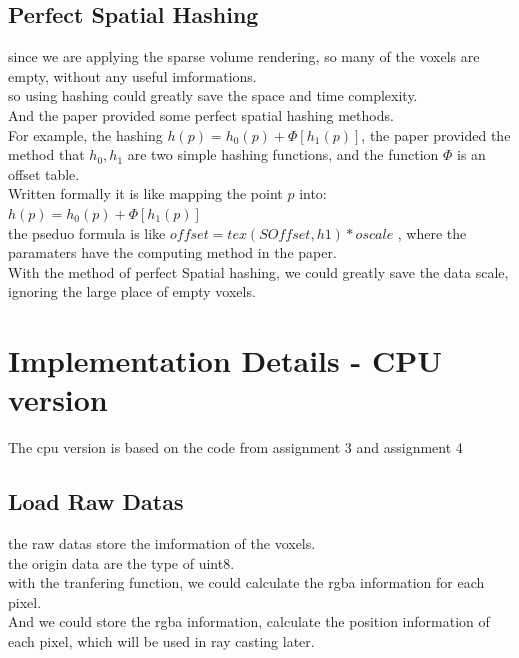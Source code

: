 \documentclass[acmtog]{acmart}
\begin{document}
\subsection{Perfect Spatial Hashing}
since we are applying the sparse volume rendering, so many of the voxels are empty, without any useful imformations.\\
so using hashing could greatly save the space and time complexity.\\
And the paper provided some perfect spatial hashing methods.\\
For example, the hashing $h(p) = h_0(p) + \Phi [h_1(p)]$, the paper provided the method that $h_0,h_1$ are two simple hashing 
functions, and the function $\Phi$ is an offset table.\\
Written formally it is like mapping the point $p$ into:\\
$h(p) = h_0(p) + \Phi [h_1(p)]$\\
the pseduo formula is like $offset = tex(SOffset, h1) * oscale$ , where the paramaters have the computing method in the paper.\\
With the method of perfect Spatial hashing, we could greatly save the data scale, ignoring the large place of empty voxels.\\

\section{Implementation Details - CPU version}
The cpu version is based on the code from assignment 3 and assignment 4
\subsection{Load Raw Datas}
the raw datas store the imformation of the voxels.\\
the origin data are the type of uint8.\\
with the tranfering function, we could calculate the rgba information for each pixel.\\
And we could store the rgba information, calculate the position information of each pixel, which will be used in ray casting later.\\
\end{document}
